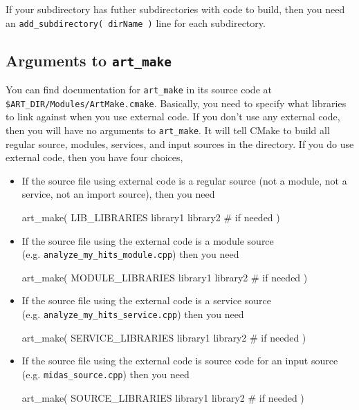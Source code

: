 If your subdirectory has futher subdirectories with code to build, then you need an %
\texttt{add\_subdirectory( dirName )} line for each subdirectory.

\subsection{Arguments to \texttt{art\_make}}
\label{sec:artmakeargs}

You can find documentation for \texttt{art\_make} in its source code at \\
\texttt{\$ART\_DIR/Modules/ArtMake.cmake}. Basically, you need to
specify what libraries to link against when you use external
code. If you don't use any external code, then
you will have no arguments to \texttt{art\_make}. It will tell CMake
to build all regular source, modules, services, and input sources in
the directory.  If you do use external code, then you have four
choices,

\begin{itemize}
\item If the source file using external code is a regular source (not a module, not a service, not an import source), then you need
  \begin{cpplisting}
    art_make( 
          LIB_LIBRARIES
          library1
          library2   # if needed
    )
  \end{cpplisting}
\item If the source file using the external code is a module source \\  (e.g. \texttt{analyze\_my\_hits\_module.cpp}) then you need
  \begin{cpplisting}
    art_make( 
          MODULE_LIBRARIES
          library1
          library2   # if needed
      )
    \end{cpplisting}
\item If the source file using the external code is a service source \\ (e.g. \texttt{analyze\_my\_hits\_service.cpp}) then you need
  \begin{cpplisting}
    art_make( 
          SERVICE_LIBRARIES
          library1
          library2   # if needed
      )
    \end{cpplisting}
\item If the source file using the external code is source code for an input source \\  (e.g. \texttt{midas\_source.cpp}) then you need
  \begin{cpplisting}
    art_make( 
          SOURCE_LIBRARIES
          library1
          library2   # if needed
      )
    \end{cpplisting}
  \end{itemize}

